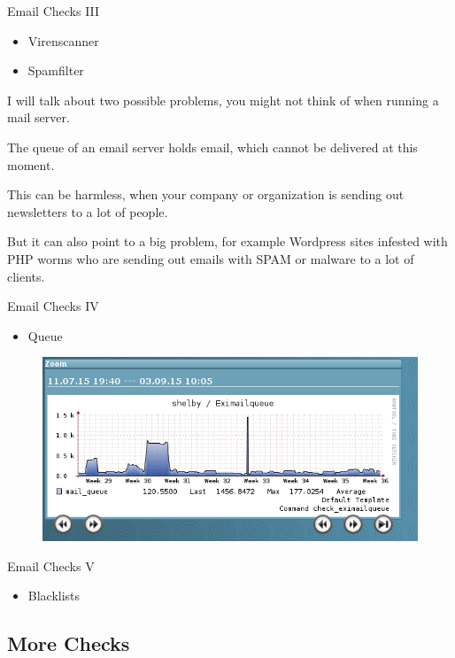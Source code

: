 \begin{frame}{Email Checks III}
\begin{itemize}
\item Virenscanner
\item Spamfilter
\end{itemize}
\end{frame}

I will talk about two possible problems,
you might not think of when running a mail server.

The queue of an email server holds email, which
cannot be delivered at this moment.

This can be harmless, when your company or organization
is sending out newsletters to a lot of people.

But it can also point to a big problem, for example
Wordpress sites infested with PHP worms who are
sending out emails with SPAM or malware to a lot
of clients.

\begin{frame}{Email Checks IV}
\begin{itemize}
\item Queue
\end{itemize}
\begin{figure}
\includegraphics[width=\textwidth]{images/mailqueue.png}
\end{figure}
\end{frame}

\begin{frame}{Email Checks V}
\begin{itemize}
\item Blacklists
\end{itemize}
\end{frame}

\subsection{More Checks}

